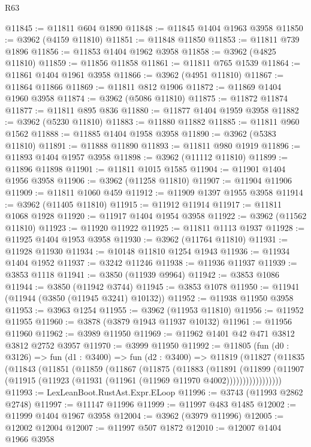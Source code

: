 \begin{lexlean}{R63}
\begin{coremodule}
@11845 := @11811 @604 @1890
@11848 := @11845 @1404 @1963 @3958
@11850 := @3962 (@4159 @11810)
@11851 := @11848 @11850
@11853 := @11811 @739 @1896
@11856 := @11853 @1404 @1962 @3958
@11858 := @3962 (@4825 @11810)
@11859 := @11856 @11858
@11861 := @11811 @765 @1539
@11864 := @11861 @1404 @1961 @3958
@11866 := @3962 (@4951 @11810)
@11867 := @11864 @11866
@11869 := @11811 @812 @1906
@11872 := @11869 @1404 @1960 @3958
@11874 := @3962 (@5086 @11810)
@11875 := @11872 @11874
@11877 := @11811 @895 @836
@11880 := @11877 @1404 @1959 @3958
@11882 := @3962 (@5230 @11810)
@11883 := @11880 @11882
@11885 := @11811 @960 @1562
@11888 := @11885 @1404 @1958 @3958
@11890 := @3962 (@5383 @11810)
@11891 := @11888 @11890
@11893 := @11811 @980 @1919
@11896 := @11893 @1404 @1957 @3958
@11898 := @3962 (@11112 @11810)
@11899 := @11896 @11898
@11901 := @11811 @1015 @1585
@11904 := @11901 @1404 @1956 @3958
@11906 := @3962 (@11258 @11810)
@11907 := @11904 @11906
@11909 := @11811 @1060 @459
@11912 := @11909 @1397 @1955 @3958
@11914 := @3962 (@11405 @11810)
@11915 := @11912 @11914
@11917 := @11811 @1068 @1928
@11920 := @11917 @1404 @1954 @3958
@11922 := @3962 (@11562 @11810)
@11923 := @11920 @11922
@11925 := @11811 @1113 @1937
@11928 := @11925 @1404 @1953 @3958
@11930 := @3962 (@11764 @11810)
@11931 := @11928 @11930
@11934 := @10148 @11810 @1254 @1943
@11936 := @11934 @1404 @1952
@11937 := @3242 @11246
@11938 := @11936 @11937
@11939 := @3853 @1118
@11941 := @3850 (@11939 @9964)
@11942 := @3853 @1086
@11944 := @3850 (@11942 @3744)
@11945 := @3853 @1078
@11950 := @11941 (@11944 (@3850 (@11945 @3241) @10132))
@11952 := @11938 @11950 @3958
@11953 := @3963 @1254
@11955 := @3962 (@11953 @11810)
@11956 := @11952 @11955
@11960 := @3878 (@3879 @1943 @11937 @10132)
@11961 := @11956 @11960
@11962 := @3989 @11950
@11969 := @11962 @1401 @42 @471 @3812 @3812 @2752 @3957
@11970 := @3999 @11950
@11992 := @11805
    (fun (d0 : @3126) =>
    fun (d1 : @3400) =>
    fun (d2 : @3400) =>
    @11819
      (@11827
        (@11835
          (@11843
            (@11851
              (@11859
                (@11867
                  (@11875
                    (@11883
                      (@11891
                        (@11899
                          (@11907
                            (@11915 (@11923 (@11931 (@11961 (@11969 @11970 @4002)))))))))))))))))
@11993 := LexLeanBoot.RustAst.Expr.ELoop
@11996 := @3743 (@11993 @2862 @2748)
@11997 := @11147 @11996
@11999 := @11997 @483 @1485
@12002 := @11999 @1404 @1967 @3958
@12004 := @3962 (@3979 @11996)
@12005 := @12002 @12004
@12007 := @11997 @507 @1872
@12010 := @12007 @1404 @1966 @3958

\end{coremodule}
\end{lexlean}

